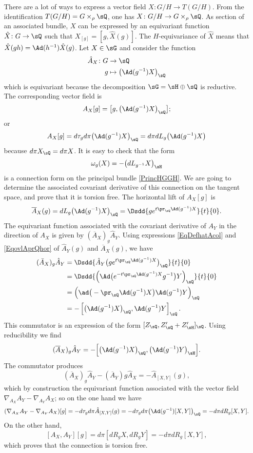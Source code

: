 There are a lot of ways to express a vector field $X\colon G/H\to T(G/H)$. From the identification $T(G/H)=G\times_{\rho}\sQ$, one has $X\colon G/H\to G\times_{\rho}\sQ$. As section of an associated bundle, $X$ can be expressed by an equivariant function $\hat{X}\colon G\to \sQ$ such that $X_{[g]}=[g,\hat{X}(g)]$. The $H$-equivariance of $\hat X$ means that $\hat{X}(gh)=\Ad(h^{-1})\hat{X}(g)$.  Let $X\in\sG$ and consider the function
\begin{equation}		\label{EqDefhatAcol}
\begin{aligned}
 \hat A_X\colon G&\to \sQ \\ 
g&\mapsto \big( \Ad(g^{-1})X \big)_{\sQ} 
\end{aligned}
\end{equation} 
which is equivariant because the decomposition $\sG=\sH\oplus\sQ$ is reductive. The corresponding vector field is
\[ 
  A_X[g]=\big[ g,\big( \Ad(g^{-1})X \big)_{\sQ} \big];
\]
or
\[ 
  A_X[g]=d\tau_gd\pi\big( \Ad(g^{-1})X \big)_{\sQ}=d\pi dL_g\big( \Ad(g^{-1})X \big)
\]
because $d\pi X_{\sQ}=d\pi X$. It is easy to check that the form
\[ 
  \omega_g(X)=-\big( dL_{g^{-1}}X \big)_{\sH}
\]
is a connection form on the principal bundle \eqref{PrincHGGH}.  We are going to determine the associated covariant derivative of this connection on the tangent space, and prove that it is torsion free. The horizontal lift of $A_X[g]$ is 
\begin{equation}	\label{EqovlAprQhor}
  \overline{ A }_X(g)=dL_g\big( \Ad(g^{-1})X \big)_{\sQ}=\Dsdd{ g e^{t\pr_{\sQ}\Ad(g^{-1})X} }{t}{0}.
\end{equation}
The equivariant function associated with the covariant derivative of $A_Y$ in the direction of $A_X$ is given by $(\overline{ A }_X)_g\hat A_Y$. Using expressions  \eqref{EqDefhatAcol} and  \eqref{EqovlAprQhor} of $\hat A_Y(g)$ and $\overline{ A }_X(g)$, we have
\[ 
\begin{split}
  (\bar A_X)_g\hat A_Y	&=\Dsdd{ \hat A_Y\big( g e^{t\pr_{\sQ}\Ad(g^{-1})X} \big)_{\sQ} }{t}{0}\\
			&=\Dsdd{ \left( \Ad\big(  e^{-t\pr_{\sQ}\Ad(g^{-1})X}g^{-1}  \big)Y \right)_{\sQ} }{t}{0}\\
			&=\Big( \ad\big( -\pr_{\sQ}\Ad(g^{-1})X \big)\Ad(g^{-1})Y \Big)_{\sQ}\\
			&=-\left[ \big( \Ad(g^{-1})X \big)_{\sQ},\Ad(g^{-1})Y  \right]_{\sQ}.
\end{split}  
\]
This commutator is an expression of the form $[Z_{\sQ},Z'_{\sQ}+Z'_{\sH}]_{\sQ}$. Using reducibility we find
\begin{equation}
  (\overline{ A }_X)_g\hat A_Y=-\Big[ \big( \Ad(g^{-1})X \big)_{\sQ},\big( \Ad(g^{-1})Y \big)_{\sH} \Big].
\end{equation}
The commutator produces
\[ 
  (\overline{ A }_X)_g\hat A_Y-(\overline{ A }_Y)g\hat A_X=-\hat A_{[X,Y]}(g),
\]
which by construction the equivariant function associated with the vector field $\nabla_{A_X}A_Y-\nabla_{A_Y}A_X$; so on the one hand we have
\[ 
(\nabla_{A_X}A_Y-\nabla_{A_Y}A_X)[g]=-d\tau_gd\pi\hat A_{[X,Y]}(g)
		=-d\tau_gd\pi\big( \Ad(g^{-1})[X,Y] \big)_{\sQ}
		=-d\pi dR_g[X,Y].
\]
On the other hand,
\[ 
  [A_X,A_Y][g]=d\pi[dR_g X,dR_gY]=-d\pi dR_g[X,Y],
\]
which proves that the connection is torsion free.

